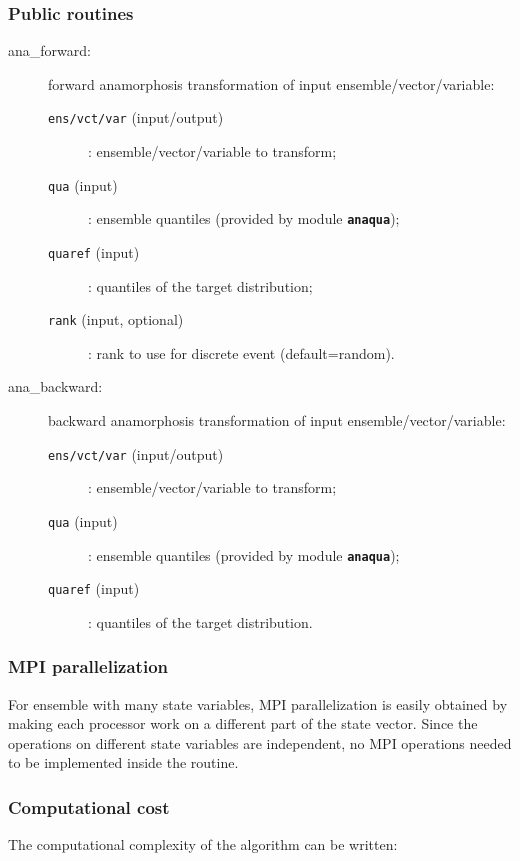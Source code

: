 \documentclass[11pt]{article}
\begin{document}
\subsubsection*{Public routines}

\begin{description}
\item[ana\_forward:] forward anamorphosis transformation of input ensemble/vector/variable:
  \begin{description}
  \item[{\tt ens/vct/var} (input/output)]: ensemble/vector/variable to transform;
  \item[{\tt qua} (input)]: ensemble quantiles (provided by module {\tt\bf anaqua});
  \item[{\tt quaref} (input)]: quantiles of the target distribution;
  \item[{\tt rank} (input, optional)]: rank to use for discrete event (default=random).
  \end{description}
\item[ana\_backward:] backward anamorphosis transformation of input ensemble/vector/variable:
  \begin{description}
  \item[{\tt ens/vct/var} (input/output)]: ensemble/vector/variable to transform;
  \item[{\tt qua} (input)]: ensemble quantiles (provided by module {\tt\bf anaqua});
  \item[{\tt quaref} (input)]: quantiles of the target distribution.
  \end{description}
\end{description}

\subsubsection*{MPI parallelization}

For ensemble with many state variables,
MPI parallelization is easily obtained by making each processor
work on a different part of the state vector.
Since the operations on different state variables are independent,
no MPI operations needed to be implemented inside the routine.

\subsubsection*{Computational cost}

The computational complexity of the algorithm can be written:
\end{document}
